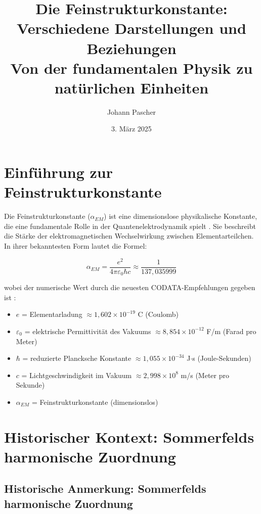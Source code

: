 \documentclass[12pt,a4paper]{article}
\begin{document}
	
	\title{Die Feinstrukturkonstante: Verschiedene Darstellungen und Beziehungen \\
		Von der fundamentalen Physik zu natürlichen Einheiten}
	\author{Johann Pascher}
	\date{3. März 2025}
	
	\maketitle
	\tableofcontents
	\section{Einführung zur Feinstrukturkonstante}
	
	Die Feinstrukturkonstante ($\alpha_{EM}$) ist eine dimensionslose physikalische Konstante, die eine fundamentale Rolle in der Quantenelektrodynamik spielt \cite{Jackson1999}. Sie beschreibt die Stärke der elektromagnetischen Wechselwirkung zwischen Elementarteilchen. In ihrer bekanntesten Form lautet die Formel:
	
	\begin{equation}
		\alpha_{EM} = \frac{e^2}{4\pi\varepsilon_0\hbar c} \approx \frac{1}{137,035999}
	\end{equation}
	
	wobei der numerische Wert durch die neuesten CODATA-Empfehlungen gegeben ist \cite{Mohr2016}:
	\begin{itemize}
		\item $e$ = Elementarladung $\approx 1,602 \times 10^{-19}$ C (Coulomb)
		\item $\varepsilon_0$ = elektrische Permittivität des Vakuums $\approx 8,854 \times 10^{-12}$ F/m (Farad pro Meter)
		\item $\hbar$ = reduzierte Plancksche Konstante $\approx 1,055 \times 10^{-34}$ J$\cdot$s (Joule-Sekunden)
		\item $c$ = Lichtgeschwindigkeit im Vakuum $\approx 2,998 \times 10^8$ m/s (Meter pro Sekunde)
		\item $\alpha_{EM}$ = Feinstrukturkonstante (dimensionslos)
	\end{itemize}
	
	\section{Historischer Kontext: Sommerfelds harmonische Zuordnung}
	
	\subsection{Historische Anmerkung: Sommerfelds harmonische Zuordnung}
	
\end{document}
